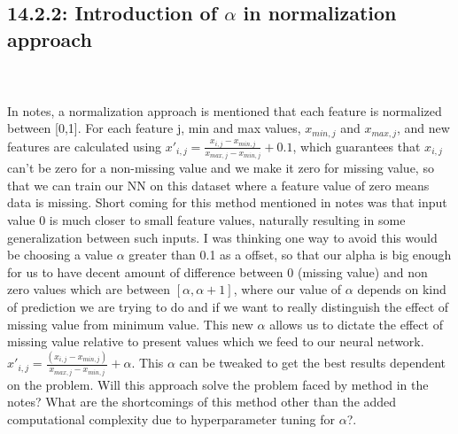 \documentclass{article}
\begin{document}
\subsection{14.2.2: Introduction of $\alpha$ in normalization approach} 
\\\\
In notes, a normalization approach is mentioned that each feature is normalized between [0,1]. For each feature j, min and max values, $x_{min, j}$ and $x_{max,j}$, and new features are calculated using $x'_{i,j} = \frac{x_{i,j} - x_{min,j}}{x_{max,j} - x_{min,j}} + 0.1$, which guarantees that $x_{i,j}$ can't be zero for a non-missing value and we make it zero for missing value, so that we can train our NN on this dataset where a feature value of zero means data is missing. Short coming for this method mentioned in notes was that input value 0 is much closer to small feature values, naturally resulting in some generalization between such inputs. I was thinking one way to avoid this would be choosing a value $\alpha$ greater than 0.1 as a offset, so that our alpha is big enough for us to have decent amount of difference between 0 (missing value) and non zero values which are between $[\alpha, \alpha+1]$, where our value of $\alpha$ depends on kind of prediction we are trying to do and if we want to really distinguish the effect of missing value from minimum value. This new $\alpha$ allows us to dictate the effect of missing value relative to present values which we feed to our neural network.  $x'_{i,j} = \frac{(x_{i,j} - x_{min,j})}{x_{max,j} - x_{min,j}} + \alpha$. This $\alpha$ can be tweaked to get the best results dependent on the problem. Will this approach solve the problem faced by method in the notes? What are the shortcomings of this method other than the added computational complexity due to hyperparameter tuning for $\alpha$?.
\end{document}
